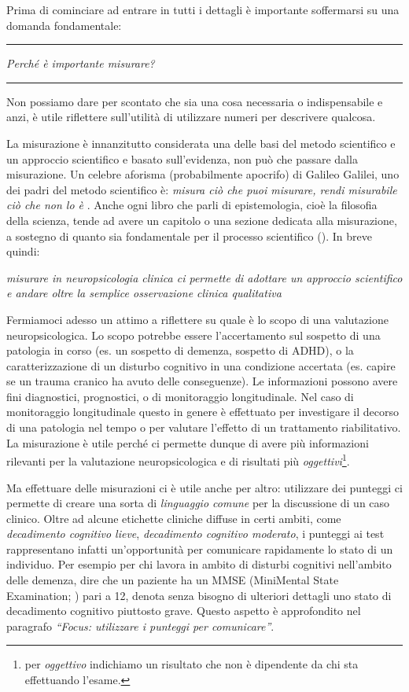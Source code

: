 \documentclass[
  italian,
  letterpaper,
  paper=A4,
  headinclude=on,
  footinclude=on,
  12pt]{scrbook}
\newenvironment{domanda}{%
  \par\medskip\noindent\rule{\linewidth}{0.4pt}\vspace{3pt}%
  \begin{center}\large\itshape
}{%
  \end{center}\vspace{-4pt}\noindent\rule{\linewidth}{0.4pt}\par\medskip
}
\begin{document}
\pagebreak

Prima di cominciare ad entrare in tutti i dettagli è importante
soffermarsi su una domanda fondamentale:

\begin{domanda}

\emph{Perché è importante misurare?}

\end{domanda}

Non possiamo dare per scontato che sia una cosa necessaria o
indispensabile e anzi, è utile riflettere sull'utilità di utilizzare
numeri per descrivere qualcosa.

La misurazione è innanzitutto considerata una delle basi del metodo
scientifico e un approccio scientifico e basato sull'evidenza, non può
che passare dalla misurazione. Un celebre aforisma (probabilmente
apocrifo) di Galileo Galilei, uno dei padri del metodo scientifico è:
\emph{misura ciò che puoi misurare, rendi misurabile ciò che non lo è} .
Anche ogni libro che parli di epistemologia, cioè la filosofia della
scienza, tende ad avere un capitolo o una sezione dedicata alla
misurazione, a sostegno di quanto sia fondamentale per il processo
scientifico (\cite{boniolo1999filosofia}). In breve quindi:

\emph{misurare in neuropsicologia clinica ci permette di adottare un
approccio scientifico e andare oltre la semplice osservazione clinica
qualitativa}

Fermiamoci adesso un attimo a riflettere su quale è lo scopo di una
valutazione neuropsicologica. Lo scopo potrebbe essere l'accertamento
sul sospetto di una patologia in corso (es. un sospetto di demenza,
sospetto di ADHD), o la caratterizzazione di un disturbo cognitivo in
una condizione accertata (es. capire se un trauma cranico ha avuto delle
conseguenze). Le informazioni possono avere fini diagnostici,
prognostici, o di monitoraggio longitudinale. Nel caso di monitoraggio
longitudinale questo in genere è effettuato per investigare il decorso
di una patologia nel tempo o per valutare l'effetto di un trattamento
riabilitativo. La misurazione è utile perché ci permette dunque di avere
più informazioni rilevanti per la valutazione neuropsicologica e di
risultati più \emph{oggettivi}\footnote{per \emph{oggettivo} indichiamo
  un risultato che non è dipendente da chi sta effettuando l'esame.}.

Ma effettuare delle misurazioni ci è utile anche per altro: utilizzare
dei punteggi ci permette di creare una sorta di \emph{linguaggio comune}
per la discussione di un caso clinico. Oltre ad alcune etichette
cliniche diffuse in certi ambiti, come \emph{decadimento cognitivo
lieve}, \emph{decadimento cognitivo moderato}, i punteggi ai test
rappresentano infatti un'opportunità per comunicare rapidamente lo stato
di un individuo. Per esempio per chi lavora in ambito di disturbi
cognitivi nell'ambito delle demenza, dire che un paziente ha un MMSE
(MiniMental State Examination; \cite{folstein1975mini}) pari a 12,
denota senza bisogno di ulteriori dettagli uno stato di decadimento
cognitivo piuttosto grave. Questo aspetto è approfondito nel paragrafo
\emph{``Focus: utilizzare i punteggi per comunicare''}.
\end{document}
